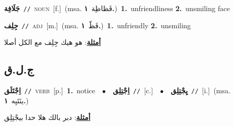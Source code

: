 \documentclass[10pt,a4paper,twoside]{article} %
\begin{document}
\begin{multicols}{2}
{\setlength\topsep{0pt}\textbf{\foreignlanguage{arabic}{جَلَافِة}}\ {\color{gray}\texttt{//}\color{black}}\ \textsc{noun}\ [f.]\ \color{gray}(msa. \foreignlanguage{arabic}{فَظاظِة}~\foreignlanguage{arabic}{\textbf{١.}})\color{black}\ \textbf{1.}~unfriendliness  \textbf{2.}~unsmiling face\ } \vspace{2mm}

{\setlength\topsep{0pt}\textbf{\foreignlanguage{arabic}{جِلِف}}\ {\color{gray}\texttt{//}\color{black}}\ \textsc{adj}\ [m.]\ \color{gray}(msa. \foreignlanguage{arabic}{فَظّ}~\foreignlanguage{arabic}{\textbf{١.}})\color{black}\ \textbf{1.}~unfriendly  \textbf{2.}~unsmiling\  \begin{flushright}\color{gray}\foreignlanguage{arabic}{\textbf{\underline{\foreignlanguage{arabic}{أمثلة}}}: هو هيك جِلِف مع الكل أصلا}\end{flushright}\color{black}} \vspace{2mm}

\vspace{-3mm}
\subsection*{\color{blue}\foreignlanguage{arabic}{ج.ل.ق}\color{blue}{}} 

{\setlength\topsep{0pt}\textbf{\foreignlanguage{arabic}{اِجْتَلَق}}\ {\color{gray}\texttt{//}\color{black}}\ \textsc{verb}\ [p.]\ \textbf{1.}~notice\ \ $\bullet$\ \ \setlength\topsep{0pt}\textbf{\foreignlanguage{arabic}{اِجْتِلِق}}\ {\color{gray}\texttt{//}\color{black}}\ [c.]\ \ $\bullet$\ \ \setlength\topsep{0pt}\textbf{\foreignlanguage{arabic}{يِجْتِلِق}}\ {\color{gray}\texttt{//}\color{black}}\ [i.]\ \color{gray}(msa. \foreignlanguage{arabic}{ينَتَبِه}~\foreignlanguage{arabic}{\textbf{١.}})\color{black}\  \begin{flushright}\color{gray}\foreignlanguage{arabic}{\textbf{\underline{\foreignlanguage{arabic}{أمثلة}}}: دبر بالك هلا حدا بيجْتِلِق}\end{flushright}\color{black}} \vspace{2mm}


\end{multicols}
\end{document}
